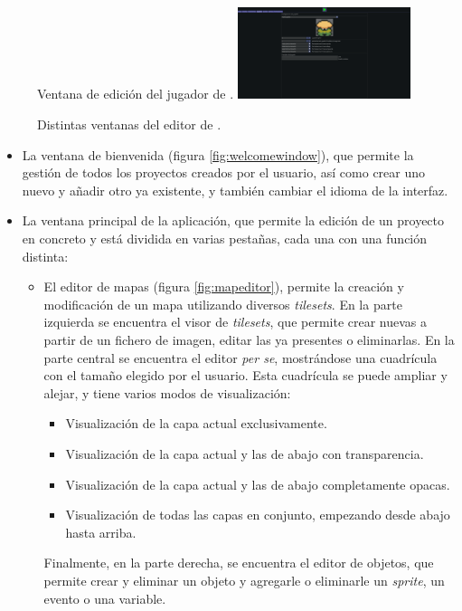 \begin{figure}[t]
\begin{SubFloat}
	\end{SubFloat}
	\qquad
	\begin{SubFloat}
		{\label{fig:playerwindow}%
		Ventana de edición del jugador de \baker.}%
		\includegraphics[width=0.45\textwidth]{Imagenes/Vectorial/jugador}%
	\end{SubFloat}
	\caption{Distintas ventanas del editor de \baker. \label{fig:menusbaker}}
\end{figure}

\begin{itemize}
	\item La ventana de bienvenida (figura \ref{fig:welcomewindow}), que permite la gestión de todos los proyectos creados por el usuario, así como crear uno nuevo y añadir otro ya existente, y también cambiar el idioma de la interfaz.
	\item La ventana principal de la aplicación, que permite la edición de un proyecto en concreto y está dividida en varias pestañas, cada una con una función distinta:
	\begin{itemize}
		\item El editor de mapas (figura \ref{fig:mapeditor}), permite la creación y modificación de un mapa utilizando diversos \textit{tilesets}. En la parte izquierda se encuentra el visor de \textit{tilesets}, que permite crear nuevas a partir de un fichero de imagen, editar las ya presentes o eliminarlas. En la parte central se encuentra el editor \textit{per se}, mostrándose una cuadrícula con el tamaño elegido por el usuario. Esta cuadrícula se puede ampliar y alejar, y tiene varios modos de visualización:
		\begin{itemize}
			\item Visualización de la capa actual exclusivamente.
			\item Visualización de la capa actual y las de abajo con transparencia.
			\item Visualización de la capa actual y las de abajo completamente opacas.
			\item Visualización de todas las capas en conjunto, empezando desde abajo hasta arriba.
		\end{itemize}
		Finalmente, en la parte derecha, se encuentra el editor de objetos, que permite crear y eliminar un objeto y agregarle o eliminarle un \textit{sprite}, un evento o una variable.

\end{itemize}
\end{itemize}

